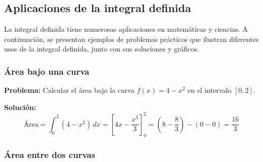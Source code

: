 \subsection{Aplicaciones de la integral definida}
La integral definida tiene numerosas aplicaciones en matemáticas y ciencias. A continuación, se presentan ejemplos de problemas prácticos que ilustran diferentes usos de la integral definida, junto con sus soluciones y gráficos.



\subsubsection{Área bajo una curva}
\begin{example}
    \textbf{Problema:} Calcular el área bajo la curva \( f(x) = 4 - x^2 \) en el intervalo \([0, 2]\).
    
    \textbf{Solución:}
    \[
    \text{Área} = \int_0^2 (4 - x^2) \, dx = \left[ 4x - \frac{x^3}{3} \right]_0^2 = (8 - \frac{8}{3}) - (0 - 0) = \frac{16}{3}
    \]
    
    \begin{center}
    \end{center}
    
    \end{example}
\newpage


\subsubsection{Área entre dos curvas}

